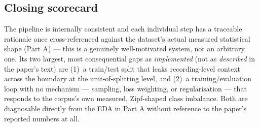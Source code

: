 \documentclass[11pt]{article}
\begin{document}
\subsection{Closing scorecard}

The pipeline is internally consistent and each individual step has a
traceable rationale once cross-referenced against the dataset's actual
measured statistical shape (Part A) --- this is a genuinely well-motivated
system, not an arbitrary one. Its two largest, most consequential gaps as
\emph{implemented} (not as \emph{described} in the paper's text) are
(1)~a train/test split that leaks recording-level context across the
boundary at the unit-of-splitting level, and (2)~a training/evaluation loop
with no mechanism --- sampling, loss weighting, or regularisation --- that
responds to the corpus's own measured, Zipf-shaped class imbalance. Both
are diagnosable directly from the EDA in Part A without reference to the
paper's reported numbers at all.
\end{document}

